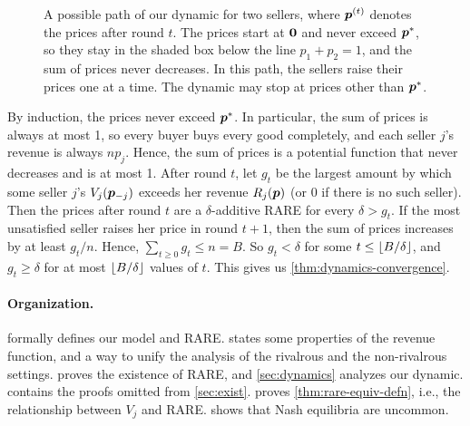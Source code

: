 \begin{figure}[t]
\centering

\caption{A possible path of our dynamic for two sellers,
where $\bm{p}^{(t)}$ denotes the prices after round $t$.
The prices start at $\mathbf{0}$ and never exceed $\bm{p}^*$,
so they stay in the shaded box below the line $p_1 + p_2 = 1$,
and the sum of prices never decreases.
In this path, the sellers raise their prices one at a time.
The dynamic may stop at prices other than $\bm{p}^*$.}
\label{fig:dynamics-path}
\end{figure}

By induction, the prices never exceed $\bm{p}^*$.
In particular, the sum of prices is always at most 1,
so every buyer buys every good completely, and each seller $j$'s revenue is always $np_j$.
Hence, the sum of prices is a potential function that never decreases and is at most 1.
After round $t$, let $g_t$ be the largest amount by which some seller $j$'s $V_j(\bm{p}_{-j})$
exceeds her revenue $R_j(\bm{p})$ (or 0 if there is no such seller).
Then the prices after round $t$ are a $\delta$-additive RARE for every $\delta > g_t$.
If the most unsatisfied seller raises her price in round $t+1$,
then the sum of prices increases by at least $g_t/n$.
Hence, $\sum_{t \ge 0} g_t \le n = B$.
So $g_t < \delta$ for some $t \le \lfloor B/\delta \rfloor$,
and $g_t \ge \delta$ for at most $\lfloor B/\delta \rfloor$ values of $t$.
This gives us \cref{thm:dynamics-convergence}.

\paragraph{Organization.}
 formally defines our model and RARE.
 states some properties of the revenue function, and a way to unify the analysis of the rivalrous and the non-rivalrous settings.
 proves the existence of RARE, and \cref{sec:dynamics} analyzes our dynamic.
 contains the proofs omitted from \cref{sec:exist}.
 proves \cref{thm:rare-equiv-defn}, i.e.,
the relationship between $V_j$ and RARE.
 shows that Nash equilibria are uncommon.
